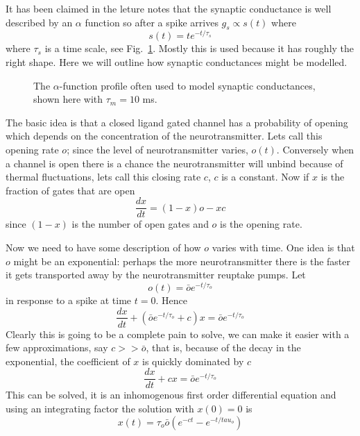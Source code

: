 \documentclass[11pt,a4paper]{scrartcl}
\begin{document}
It has been claimed in the leture notes that the synaptic conductance is well described by an $\alpha$ function so after a spike arrives $g_s\propto s(t)$ where
\begin{equation}
s(t)=te^{-t/\tau_s}
\end{equation}
where $\tau_s$ is a time scale, see Fig.~\ref{fig:alpha}. Mostly this
is used because it has roughly the right shape. Here we will outline
how synaptic conductances might be modelled.

\begin{figure}
\begin{center}

\end{center}
\caption{The $\alpha$-function profile often used to model synaptic
  conductances, shown here with $\tau_m=10$ ms.\label{fig:alpha}}
\end{figure}

The basic idea is that a closed ligand gated channel has a probability
of opening which depends on the concentration of the
neurotransmitter. Lets call this opening rate $o$; since the level of
neurotransmitter varies, $o(t)$. Conversely when a channel is open
there is a chance the neurotransmitter will unbind because of thermal
fluctuations, lets call this closing rate $c$, $c$ is a constant. Now
if $x$ is the fraction of gates that are open
\begin{equation}
\frac{dx}{dt}=(1-x)o-xc
\end{equation}
since $(1-x)$ is the number of open gates and $o$ is the opening rate.

Now we need to have some description of how $o$ varies with time. One
idea is that $o$ might be an exponential: perhaps the more
neurotransmitter there is the faster it gets transported away by the
neurotransmitter reuptake pumps. Let
\begin{equation}
o(t)=\bar{o}e^{-t/\tau_o}
\end{equation}
in response to a spike at time $t=0$. Hence
\begin{equation}
\frac{dx}{dt}+(\bar{o}e^{-t/\tau_o}+c)x=\bar{o}e^{-t/\tau_o}
\end{equation}
Clearly this is going to be a complete pain to solve, we can make it easier with a few approximations, say $c>>\bar{o}$, that is, because of the decay in the exponential, the coefficient of $x$ is quickly dominated by $c$
\begin{equation}
\frac{dx}{dt}+cx=\bar{o}e^{-t/\tau_o}
\end{equation}
This can be solved, it is an inhomogenous first order differential
equation and using an integrating factor the solution with $x(0)=0$ is
\begin{equation}
x(t)=\tau_o\bar{o}\left(e^{-ct}-e^{-t/tau_o}\right)
\end{equation}
\end{document}
